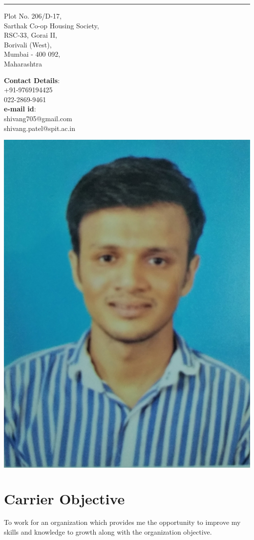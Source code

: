 \documentclass{article}
\renewcommand{\maketitle}{
\begin{center}
	{\huge\bfseries
	\theauthor}
\end{center}
}
\begin{document}
\author{Shivang Patel}\date{}
\maketitle

\hrule
\vspace{10pt}

\begin{minipage}{.4\textwidth}
Plot No. 206/D-17,\\ Sarthak Co-op Housing Society,\\ RSC-33, Gorai II,\\ Borivali (West),\\ Mumbai - 400 092,\\ Maharashtra
\end{minipage}
\begin{minipage}{.39\textwidth}
\textbf{Contact Details}:\\ +91-9769194425\\ 022-2869-9461\\
\textbf{e-mail id}:\\ shivang705@gmail.com\\ shivang.patel@spit.ac.in
\end{minipage}
\begin{minipage}{.4\textwidth}
	\includegraphics[scale=0.03]{myPhoto.jpg}
\end{minipage}

\section{Carrier Objective}
To work for an organization which provides me the opportunity to improve my skills and knowledge to growth along with the organization objective.
\end{document}
